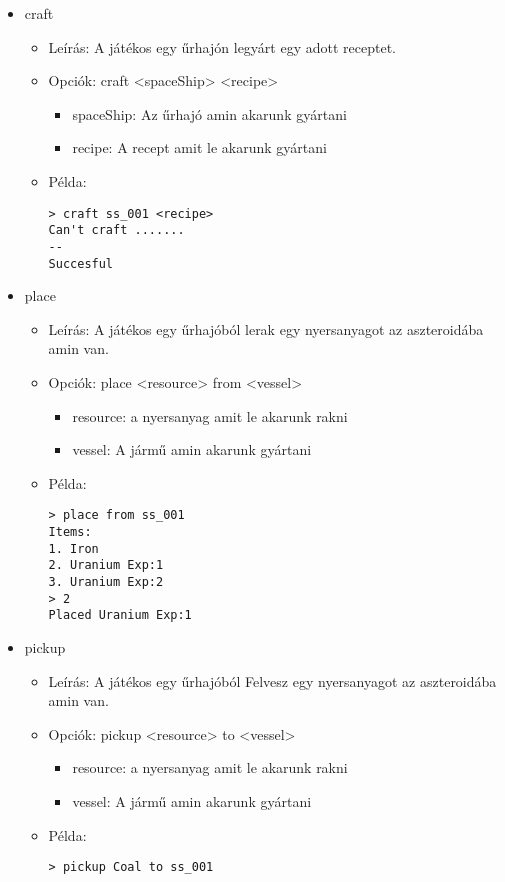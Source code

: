 \documentclass[../../projlab]{subfiles}
\begin{document}
\begin{itemize}
    \item craft
    \begin{itemize}
        \item Leírás: A játékos egy űrhajón legyárt egy adott receptet.
        \item Opciók: craft <spaceShip> <recipe>
        \begin{itemize}
            \item spaceShip: Az űrhajó amin akarunk gyártani
            \item recipe: A recept amit le akarunk gyártani
        \end{itemize}
        \item Példa:
            \begin{verbatim}
> craft ss_001 <recipe>
Can't craft .......
--
Succesful
            \end{verbatim}
    \end{itemize}


    \item place
    \begin{itemize}
        \item Leírás: A játékos egy űrhajóból lerak egy nyersanyagot az aszteroidába amin van.
        \item Opciók: place <resource> from <vessel>
        \begin{itemize}
            \item resource: a nyersanyag amit le akarunk rakni
            \item vessel: A jármű amin akarunk gyártani
        \end{itemize}
        \item Példa:
            \begin{verbatim}
> place from ss_001
Items:
1. Iron
2. Uranium Exp:1
3. Uranium Exp:2
> 2
Placed Uranium Exp:1
            \end{verbatim}
    \end{itemize}

    \item pickup
    \begin{itemize}
        \item Leírás: A játékos egy űrhajóból Felvesz egy nyersanyagot az aszteroidába amin van.
        \item Opciók: pickup <resource> to <vessel>
        \begin{itemize}
            \item resource: a nyersanyag amit le akarunk rakni
            \item vessel: A jármű amin akarunk gyártani
        \end{itemize}
        \item Példa:
            \begin{verbatim}
> pickup Coal to ss_001
            \end{verbatim}
    \end{itemize}



\end{itemize}
\end{document}
